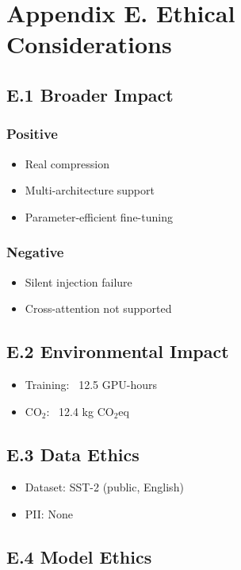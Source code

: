 \section{Appendix E. Ethical Considerations}

\subsection{E.1 Broader Impact}

\subsubsection{Positive}
\begin{itemize}
\item Real compression
\item Multi-architecture support
\item Parameter-efficient fine-tuning

\end{itemize}
\subsubsection{Negative}
\begin{itemize}
\item Silent injection failure
\item Cross-attention not supported

\end{itemize}
\subsection{E.2 Environmental Impact}

\begin{itemize}
\item Training: ~12.5 GPU-hours
\item CO$_2$: ~12.4 kg CO$_2$eq

\end{itemize}
\subsection{E.3 Data Ethics}

\begin{itemize}
\item Dataset: SST-2 (public, English)
\item PII: None

\end{itemize}
\subsection{E.4 Model Ethics}

